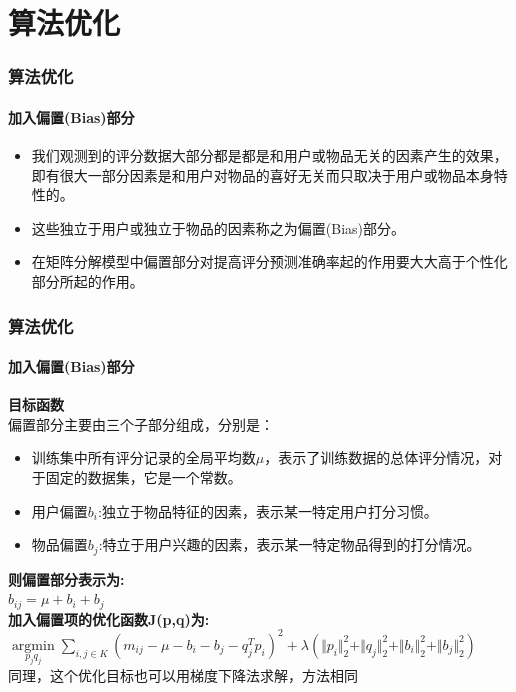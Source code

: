 \documentclass{beamer}
\begin{document}
\section{算法优化}
	\begin{frame}
	\frametitle{算法优化}
	\framesubtitle{加入偏置(Bias)部分}
		\begin{itemize}
  			\item 我们观测到的评分数据大部分都是都是和用户或物品无关的因素产生的效果，即有很大一部分因素是和用户对物品的喜好无关而只取决于用户或物品本身特性的。
  			\item 这些独立于用户或独立于物品的因素称之为偏置(Bias)部分。
  			\item 在矩阵分解模型中偏置部分对提高评分预测准确率起的作用要大大高于个性化部分所起的作用。
		\end{itemize}
	\end{frame}
	\begin{frame}
	\frametitle{算法优化}
	\framesubtitle{加入偏置(Bias)部分}
		\textbf{目标函数}\\
		偏置部分主要由三个子部分组成，分别是：
		\begin{minipage}[c][0.35\textheight][c]{\linewidth}
			\centering
			\begin{itemize}
  				\item 训练集中所有评分记录的全局平均数$\mu$，表示了训练数据的总体评分情况，对于固定的数据集，它是一个常数。
  				\item 用户偏置$b_i$:独立于物品特征的因素，表示某一特定用户打分习惯。
  				\item 物品偏置$b_j$:特立于用户兴趣的因素，表示某一特定物品得到的打分情况。	
  			\end{itemize}
		\end{minipage}
		\begin{minipage}[c][0.15\textheight][c]{\linewidth}
			\centering
			\textbf{则偏置部分表示为:}\\
			$b_{ij}=\mu+b_i+b_j$\\
			\textbf{加入偏置项的优化函数J(p,q)为:}\\
			$\mathop{\arg\min}\limits_{p_j q_j}\sum_{i,j\in K}(m_{ij}-\mu-b_i-b_j-q_j^Tp_i)^2+\lambda(\Vert p_i \Vert_2^2+\Vert q_j \Vert_2^2+\Vert b_i \Vert_2^2+\Vert b_j \Vert_2^2)$\\
			同理，这个优化目标也可以用梯度下降法求解，方法相同
		\end{minipage}
	\end{frame}
\end{document}
